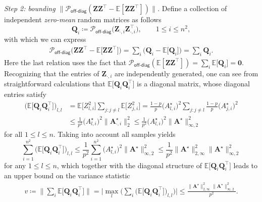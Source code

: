 \bigskip\noindent
{\em Step 2: bounding $\|\mathcal{P}_{\mathsf{off}\text{-}\mathsf{diag}} (\bm{Z}\bm{Z}^{\top} -\mathbb{E}[\bm{Z}\bm{Z}^{\top} ] ) \|$.}
 Define a collection of independent {\em zero-mean} random matrices as follows
%
\[
	\bm{Q}_{i}\coloneqq  \mathcal{P}_{\mathsf{off}\text{-}\mathsf{diag}}\big(\bm{Z}_{\cdot,i}\bm{Z}_{\cdot,i}^{\top}\big),
	\qquad 1\leq i\leq n^2,
\]
%
with which we can express
%
\begin{align}
	\mathcal{P}_{\mathsf{off}\text{-}\mathsf{diag}}\big(\bm{Z}\bm{Z}^{\top} -\mathbb{E}\big[\bm{Z}\bm{Z}^{\top}\big] \big)
	= \sum\nolimits_i  \Big( \bm{Q}_{i} - \mathbb{E}\big[ \bm{Q}_{i} \big] \Big) = \sum\nolimits_i  \bm{Q}_{i} .
	\label{eq:P-offdiag-ZZ-TC}
\end{align}
%
Here the last relation uses the fact that $\mathcal{P}_{\mathsf{off}\text{-}\mathsf{diag}} (\mathbb{E}[\bm{Z}\bm{Z}^{\top} ] ) = \sum_{i}\mathbb{E}\big[ \bm{Q}_{i} \big] = \bm{0}$.
Recognizing that the entries of $\bm{Z}_{\cdot,i}$ are independently
generated, one can see from straightforward calculations that $\mathbb{E}\big[\bm{Q}_{i}\bm{Q}_{i}^{\top}\big]$
is a diagonal matrix, whose diagonal entries satisfy
%
\begin{align*}
\Big(\mathbb{E}\big[\bm{Q}_{i}\bm{Q}_{i}^{\top}\big]\Big)_{l,l} & =\mathbb{E}\big[Z_{l,i}^{2}\big]\sum_{j:j\neq l}\mathbb{E}\big[Z_{j,i}^{2}\big]
  = \frac{1-p}{p}\big(A_{l,i}^{\star}\big)^{2}\sum_{j:j\neq l}\frac{1-p}{p}\big(A_{j,i}^{\star}\big)^{2}\\
 & \leq\frac{1}{p^{2}}\big(A_{l,i}^{\star}\big)^{2}\big\|\bm{A}_{\cdot,i}^{\star}\big\|_{2}^{2}
	\leq\frac{1}{p^{2}}\big(A_{l,i}^{\star}\big)^{2}\big\|\bm{A}^{\star}\big\|_{\infty,2}^{2}
\end{align*}
%
for all $1\leq l\leq n$.  Taking into account all samples yields
%
\[
	\sum_{i=1}^{n^2}\Big(\mathbb{E}\big[\bm{Q}_{i}\bm{Q}_{i}^{\top}\big]\Big)_{l,l}\leq\frac{1}{p^{2}}\sum_{i=1}^{n^{2}}\big(A_{l,i}^{\star}\big)^{2}\big\|\bm{A}^{\star}\big\|_{\infty,2}^{2}\leq\frac{1}{p^{2}}\big\|\bm{A}^{\star}\big\|_{2,\infty}^{2}\big\|\bm{A}^{\star}\big\|_{\infty,2}^{2}
\]
%
for any $1\leq l\leq n$,  which together with the diagonal structure of $\mathbb{E}\big[\bm{Q}_{i}\bm{Q}_{i}^{\top}\big]$ leads to an upper bound on the variance statistic
%
\begin{align*}
	v  \coloneqq\Big\|\sum_{i}\mathbb{E}\big[\bm{Q}_{i}\bm{Q}_{i}^{\top}\big]\Big\|
	= \Big|\max_{l}\Big(\sum_{i}\Big(\mathbb{E}\big[\bm{Q}_{i}\bm{Q}_{i}^{\top}\big]\Big)_{l,l}\Big)\Big|
	\leq\frac{  \big\|\bm{A}^{\star}\big\|_{2,\infty}^{2}\big\|\bm{A}^{\star}\big\|_{\infty,2}^{2} }{p^{2}}.
\end{align*}
